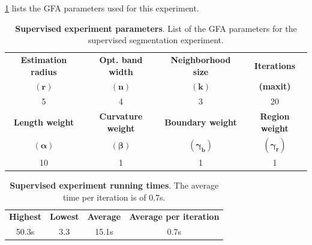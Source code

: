 \documentclass[review]{siamart220329}
\begin{document}
\cref{tab:coco-experiment-parameter} lists the GFA parameters used for this experiment.
%
%
\begin{table}
\center
\footnotesize
	\caption{\textbf{Supervised experiment parameters}. List of the GFA parameters for the supervised segmentation experiment.}\label{tab:coco-experiment-parameter}
\begin{tabular}{cccc}
\textbf{Estimation radius} & \textbf{Opt. band width} & \textbf{Neighborhood size} & \textbf{Iterations} \\
$\mathbf{(r)}$ & $\mathbf{(n)}$ & $\mathbf{(k)}$ & \textbf{(maxit)}\\
5 & 4 & 3 & 20\\[1em]
\textbf{Length weight} & \textbf{Curvature weight} & \textbf{Boundary weight} & \textbf{Region weight}\\
$\boldsymbol{(\alpha)}$ & $\boldsymbol{(\beta)}$ & $\boldsymbol{(\gamma_b)}$ & $\boldsymbol{(\gamma_r)}$\\
10 & 1 & 1 & 1
\end{tabular}
\end{table}
%
%
\begin{table}
\footnotesize
	\caption{\textbf{Supervised experiment running times}. The average time per iteration is of $0.7$s.}\label{tab:coco-experiment-running-time}
\center
\begin{tabular}{cccc}
\textbf{Highest} & \textbf{Lowest} & \textbf{Average} & \textbf{Average per iteration} \\
50.3s & 3.3 & 15.1s & 0.7s\\
\end{tabular}
\end{table}
%
%
\end{document}
